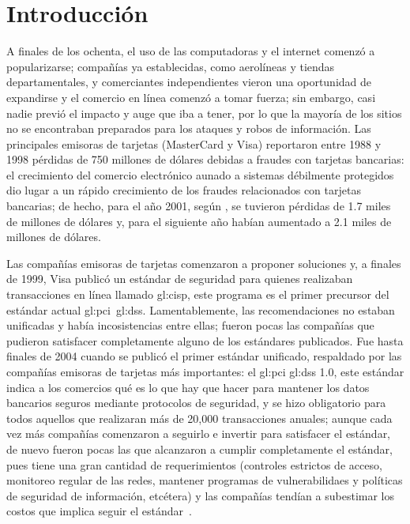 %
%

\chapter{Introducción}

A finales de los ochenta, el uso de las computadoras y el internet comenzó a
popularizarse; compañías ya establecidas, como aerolíneas y tiendas
departamentales, y comerciantes independientes vieron una oportunidad de
expandirse y el comercio en línea comenzó a tomar fuerza; sin embargo, casi
nadie previó el impacto y auge que iba a tener, por lo que la mayoría de los
sitios no se encontraban preparados para los ataques y robos de información.
Las principales emisoras de tarjetas (MasterCard y Visa) reportaron entre 1988 y
1998 pérdidas de 750 millones de dólares debidas a fraudes con
tarjetas bancarias: el crecimiento del comercio electrónico aunado a
sistemas débilmente protegidos dio lugar a un rápido crecimiento de los
fraudes relacionados con tarjetas bancarias; de hecho, para el año 2001,
según \cite{wallethub}, se tuvieron pérdidas de 1.7 miles de millones de
dólares y, para el siguiente año habían aumentado a 2.1 miles de millones de
dólares.

Las compañías emisoras de tarjetas comenzaron a proponer soluciones y,
a finales de 1999, Visa publicó un estándar de seguridad para quienes realizaban
transacciones en línea llamado \gls{gl:cisp}, este programa es el primer
precursor del estándar actual \gls{gl:pci}~\gls{gl:dss}. Lamentablemente, las
recomendaciones no estaban unificadas y había incosistencias entre ellas; fueron
pocas las compañías que pudieron satisfacer completamente alguno de los
estándares publicados. Fue hasta finales de 2004 cuando se publicó el primer
estándar unificado, respaldado por las compañías emisoras de tarjetas más
importantes: el \gls{gl:pci} \gls{gl:dss} 1.0, este estándar indica a los
comercios qué es lo que hay que hacer para mantener los datos bancarios seguros
mediante protocolos de seguridad, y se hizo obligatorio para todos aquellos que
realizaran más de 20,000 transacciones anuales; aunque cada vez más compañías
comenzaron a seguirlo e invertir para satisfacer el estándar, de nuevo fueron
pocas las que alcanzaron a cumplir completamente el estándar, pues tiene una
gran cantidad de requerimientos (controles estrictos de acceso,
monitoreo regular de las redes, mantener programas de vulnerabilidaes y
políticas de seguridad de información, etcétera) y las compañías tendían a
subestimar los costos que implica seguir el
estándar~\cite{uk_association, search_security}.

